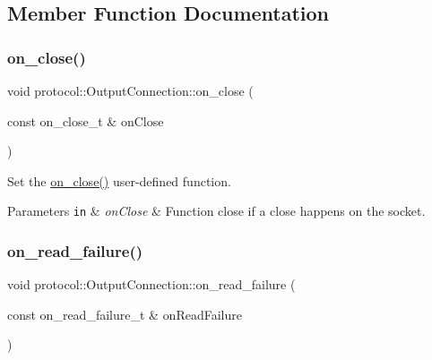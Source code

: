\subsection{Member Function Documentation}
\mbox{\label{classprotocol_1_1_output_connection_a6e16ce905582f9cbab7b442e9629d268}} 
\subsubsection{\texorpdfstring{on\+\_\+close()}{on\_close()}}
{\footnotesize\ttfamily void protocol\+::\+Output\+Connection\+::on\+\_\+close (\begin{DoxyParamCaption}\item[{const on\+\_\+close\+\_\+t \&}]{on\+Close }\end{DoxyParamCaption})}



Set the \hyperlink{classprotocol_1_1_output_connection_a6e16ce905582f9cbab7b442e9629d268}{on\+\_\+close()} user-\/defined function. 


\begin{DoxyParams}[1]{Parameters}
\mbox{\tt in}  & {\em on\+Close} & Function close if a close happens on the socket. \\
\hline
\end{DoxyParams}
\mbox{\label{classprotocol_1_1_output_connection_aa3e70f574e6db59202aa4a9cdcad7216}} 
\subsubsection{\texorpdfstring{on\+\_\+read\+\_\+failure()}{on\_read\_failure()}}
{\footnotesize\ttfamily void protocol\+::\+Output\+Connection\+::on\+\_\+read\+\_\+failure (\begin{DoxyParamCaption}\item[{const on\+\_\+read\+\_\+failure\+\_\+t \&}]{on\+Read\+Failure }\end{DoxyParamCaption})}




